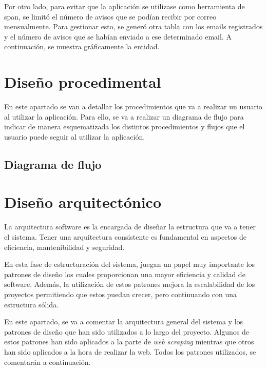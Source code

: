 
Por otro lado, para evitar que la aplicación se utilizase como herramienta de span, se limitó el número de avisos que se podían recibir por correo mensualmente. Para gestionar esto, se generó otra tabla con los emails registrados y el número de avisos que se habían enviado a ese determinado email. A continuación, se muestra gráficamente la entidad.


\section{Diseño procedimental}

En este apartado se van a detallar los procedimientos que va a realizar un usuario al utilizar la aplicación. Para ello, se va a realizar un diagrama de flujo para indicar de manera esquematizada los distintos procedimientos y flujos que el usuario puede seguir al utilizar la aplicación. 

\newpage
\begin{landscape}
\subsection{Diagrama de flujo}
\end{landscape}
\newpage

\section{Diseño arquitectónico}
La arquitectura software es la encargada de diseñar la estructura que va a tener el sistema. Tener una arquitectura consistente es fundamental en aspectos de eficiencia, mantenibilidad y seguridad.

En esta fase de estructuración del sistema, juegan un papel muy importante los patrones de diseño los cuales proporcionan una mayor eficiencia y calidad de software.
Además, la utilización de estos patrones mejora la escalabilidad de los proyectos permitiendo que estos puedan crecer, pero continuando con una estructura sólida.

En este apartado, se va a comentar la arquitectura general del sistema y los patrones de diseño que han sido utilizados a lo largo del proyecto. Algunos de estos patrones han sido aplicados a la parte de \textit{web scraping} mientras que otros han sido aplicados a la hora de realizar la web. Todos los patrones utilizados, se comentarán a continuación.

